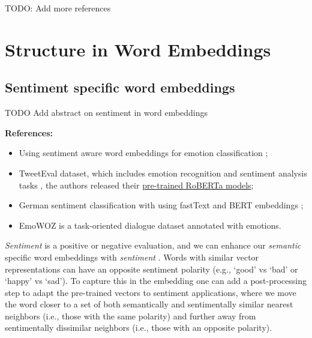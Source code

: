 \documentclass[11pt, a4paper]{amsart}
\begin{document}
TODO: Add more references

\section{Structure in Word Embeddings}

\subsection{Sentiment specific word embeddings}

TODO Add abstract on sentiment in word embeddings

\noindent \textbf{References:}
\begin{itemize}
	\item Using sentiment aware word embeddings for emotion classification \cite{sentiment-aware-word-embedding-emotion-2019};
	\item TweetEval dataset, which includes emotion recognition and sentiment analysis tasks \cite{barbieri-etal-2020-tweeteval}, the authors released their \href{https://huggingface.co/cardiffnlp/twitter-roberta-base-sentiment}{pre-trained RoBERTa models};
	\item German sentiment classification with using fastText and BERT embeddings \cite{guhr-etal-2020-training};
	\item EmoWOZ \cite{DBLP:journals/corr/abs-2109-04919} is a task-oriented dialogue dataset annotated with emotions.
\end{itemize}

{
	\color{blue}
	
	\emph{Sentiment} is a positive or negative evaluation, and we can enhance our \emph{semantic} specific word embeddings with \emph{sentiment} \cite{yu-etal-2017-refining}.
	Words with similar vector representations can have an opposite sentiment polarity (e.g., `good' vs `bad' or `happy' vs `sad').
	To capture this in the embedding one can add a post-processing step to adapt the pre-trained vectors to sentiment applications,
	where we move the word closer to a set of both semantically and sentimentally similar nearest neighbors (i.e., those with the same polarity) and further away from sentimentally dissimilar neighbors (i.e., those with an opposite polarity).
} %



\end{document}
